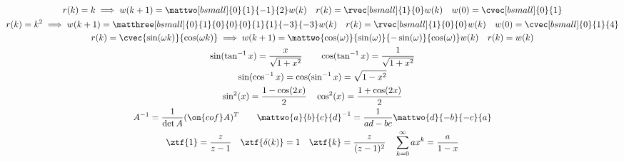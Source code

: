 \documentclass[twocolumn, 8pt]{extarticle}
\begin{document}
\begin{gather*}
    r(k) = k \implies w(k + 1) = \mattwo[bsmall]{0}{1}{-1}{2}w(k) \quad r(k) = \rvec[bsmall]{1}{0}w(k) \quad w(0) = \cvec[bsmall]{0}{1} \\
    r(k) = k^2 \implies w(k + 1) = \matthree[bsmall]{0}{1}{0}{0}{0}{1}{1}{-3}{-3}w(k) \quad r(k) = \rvec[bsmall]{1}{0}{0}w(k) \quad w(0) = \cvec[bsmall]{0}{1}{4} \\
    r(k) = \cvec{\sin(\omega k)}{\cos(\omega k)} \implies w(k + 1) = \mattwo{\cos(\omega)}{\sin(\omega)}{-\sin(\omega)}{\cos(\omega)}w(k) \quad r(k) = w(k) \\
    \sin(\tan^{-1} x) = \frac{x}{\sqrt{1 + x^2}} \qquad \cos(\tan^{-1} x) = \frac{1}{\sqrt{1 + x^2}} \\
    \sin(\cos^{-1} x) = \cos(\sin^{-1} x) = \sqrt{1 - x^2} \\
    \sin^2(x) = \frac{1 - \cos(2x)}{2} \quad \cos^2(x) = \frac{1 + \cos(2x)}{2} \\
    A^{-1} = \frac{1}{\det A}(\on{cof} A)^T \qquad \mattwo{a}{b}{c}{d}^{-1} = \frac{1}{ad - bc}\mattwo{d}{-b}{-c}{a} \\
    \ztf{1} = \frac{z}{z - 1} \quad \ztf{\delta(k)} = 1 \quad \ztf{k} = \frac{z}{(z - 1)^2} \quad \sum _{k = 0}^\infty ax^k = \frac{a}{1 - x}
\end{gather*}
\end{document}
